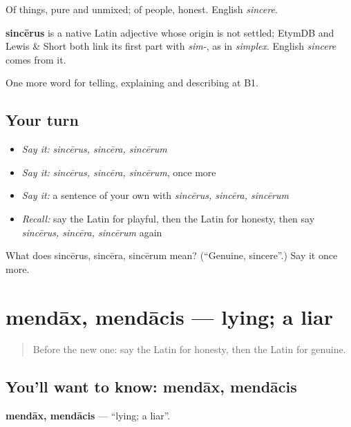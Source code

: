 Of things, pure and unmixed; of people, honest. English \emph{sincere}.

\begin{cousinweb}
\textbf{sincērus} is a native Latin adjective whose origin is not settled; EtymDB and Lewis \& Short both link its first part with \emph{sim-}, as in \emph{simplex}. English \emph{sincere} comes from it.
\end{cousinweb}

\begin{grammarlens}[title={What you've built}]
One more word for telling, explaining and describing at B1.
\end{grammarlens}

\subsection*{Your turn}
\begin{itemize}
\raggedright
  \item \emph{Say it:} \emph{sincērus, sincēra, sincērum}
  \item \emph{Say it:} \emph{sincērus, sincēra, sincērum}, once more
  \item \emph{Say it:} a sentence of your own with \emph{sincērus, sincēra, sincērum}
  \item \emph{Recall:} say the Latin for playful, then the Latin for honesty, then say \emph{sincērus, sincēra, sincērum} again
\end{itemize}

\begin{tcolorbox}[breakable,colback=teal!4,colframe=teal!35!black,title={Before you move on}]
What does sincērus, sincēra, sincērum mean? (\textquotedblleft{}Genuine, sincere\textquotedblright{}.) Say it once more.
\end{tcolorbox}
\section[mendāx, mendācis]{mendāx, mendācis — lying; a liar}

\label{lesson:LA-C504-mendax}



\begin{quote}
Before the new one: say the Latin for honesty, then the Latin for genuine.
\end{quote}

\subsection*{You'll want to know: mendāx, mendācis}
\textbf{mendāx, mendācis} — \textquotedblleft{}lying; a liar\textquotedblright{}.

